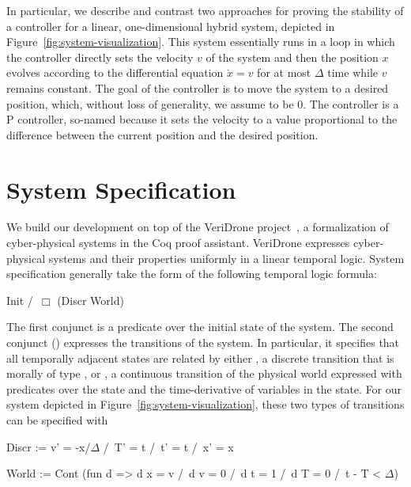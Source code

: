 \documentclass[preprint,nocopyrightspace]{sigplanconf}
\begin{document}

In particular, we describe and contrast two approaches for proving the stability of a controller for a linear, one-dimensional hybrid system, depicted in Figure~\ref{fig:system-visualization}.
This system essentially runs in a loop in which the controller directly sets the velocity $v$ of the system and then the position $x$ evolves according to the differential equation $\dot{x} = v$ for at most $\Delta$ time while $v$ remains constant.
The goal of the controller is to move the system to a desired position, which, without loss of generality,  we assume to be 0.
The controller is a P controller, so-named because it sets the velocity to a value proportional to the difference between the current position and the desired position.

\section{System Specification}
\label{sec:veridrone}

We build our development on top of the VeriDrone project~\cite{ricketts2015veridrone}, a formalization of cyber-physical systems in the Coq proof assistant.
VeriDrone expresses cyber-physical systems and their properties uniformly in a linear temporal logic.
System specification generally take the form of the following temporal logic formula:
\begin{coq}
Init /\ $\Box$ (Discr \/ World)
\end{coq}
The first conjunct  is a predicate over the initial state of the system.
The second conjunct () expresses the transitions of the system.
In particular, it specifies that all temporally adjacent states are related by either , a discrete transition that is morally of type , or , a continuous transition of the physical world expressed with predicates over the state and the time-derivative of variables in the state.
For our system depicted in Figure~\ref{fig:system-visualization}, these two types of transitions can be specified with
\begin{coq}
Discr := v' = -x/$\Delta$ /\ T' = t /\ t' = t /\ x' = x

World :=
 Cont (fun d => d x = v /\ d v = 0 /\ d t = 1 /\ d T = 0 /\ t - T < $\Delta$)
\end{coq}
\end{document}
